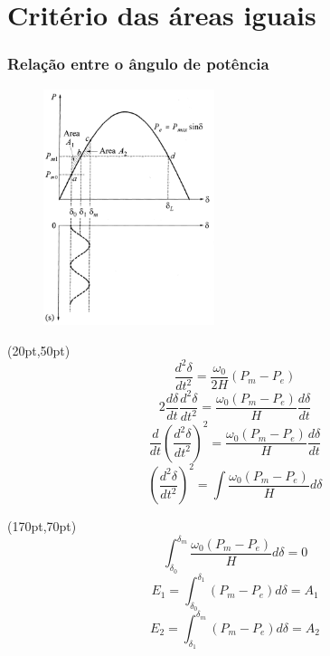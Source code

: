 \section{Critério das áreas iguais}
\begin{frame}
\frametitle{Relação entre o ângulo de potência}
\begin{figure}[H]
\begin{flushright}
\includegraphics[width=5cm]{imagens/maq5.png}  
\end{flushright}
\label{maq5} 
\end{figure}


\begin{textblock*}{10pt}(20pt,50pt)
\small
\begin{equation*}
   \frac{d^{2} \delta}{d t^2} = \frac{\omega_0}{2H}(P_m-P_e)
\end{equation*}
\vspace{0.5pt}
\begin{equation*}
   2\frac{d \delta}{d t}\frac{d^{2} \delta}{d t^2} = \frac{\omega_0(P_m-P_e)}{H}\frac{d \delta}{d t}
\end{equation*}
\vspace{0.5pt}
\begin{equation*}
   \frac{d}{d t}\left(\frac{d^{2} \delta}{d t^2}\right)^2 = \frac{\omega_0(P_m-P_e)}{H}\frac{d \delta}{d t}
\end{equation*}
\vspace{0.5pt}
\begin{equation*}
   \left(\frac{d^{2} \delta}{d t^2}\right)^2 =\int \frac{\omega_0(P_m-P_e)}{H}d \delta
\end{equation*}
\end{textblock*}


\begin{textblock*}{10pt}(170pt,70pt)
\small
\begin{equation*}
   \int_{\delta_0}^{\delta_m} \frac{\omega_0(P_m-P_e)}{H}d \delta = 0
\end{equation*}
\vspace{0.5pt}
\begin{equation*}
   E_1 = \int_{\delta_0}^{\delta_1} (P_m-P_e)d \delta = A_1
\end{equation*}
\vspace{0.5pt}
\begin{equation*}
   E_2 = \int_{\delta_1}^{\delta_m} (P_m-P_e)d \delta = A_2
\end{equation*}

\end{textblock*}

\end{frame}